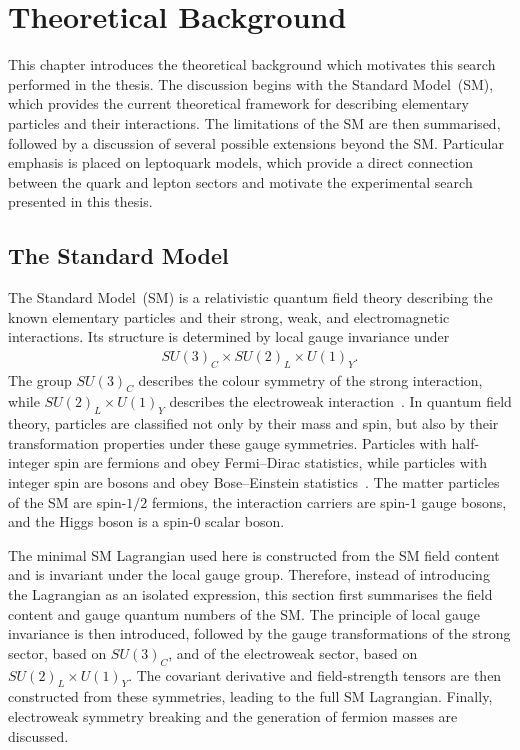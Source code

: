 \chapter{Theoretical Background}
\label{chapter:theoretical_background}

This chapter introduces the theoretical background which motivates this search performed in the thesis. 
The discussion begins with the Standard Model~(SM), which provides the current theoretical framework for describing elementary particles and their interactions. 
The limitations of the SM are then summarised, followed by a discussion of several possible extensions beyond the SM. 
Particular emphasis is placed on leptoquark models, which provide a direct connection between the quark and lepton sectors and motivate the experimental search presented in this thesis.

\section{The Standard Model}
\label{sec:sm}

The Standard Model~(SM) is a relativistic quantum field theory describing the known elementary particles and their strong, weak, and electromagnetic interactions. 
Its structure is determined by local gauge invariance under
\begin{align}
    SU(3)_{C} \times SU(2)_{L} \times U(1)_{Y}.
\end{align}
The group $SU(3)_{C}$ describes the colour symmetry of the strong interaction, while $SU(2)_{L} \times U(1)_{Y}$ describes the electroweak interaction~\cite{Glashow1961,Weinberg1967,Salam1968}. 
In quantum field theory, particles are classified not only by their mass and spin, but also by their transformation properties under these gauge symmetries. 
Particles with half-integer spin are fermions and obey Fermi--Dirac statistics, while particles with integer spin are bosons and obey Bose--Einstein statistics~\cite{Pauli1940}. 
The matter particles of the SM are spin-$1/2$ fermions, the interaction carriers are spin-$1$ gauge bosons, and the Higgs boson is a spin-$0$ scalar boson.

The minimal SM Lagrangian used here is constructed from the SM field content and is invariant under the local gauge group. Therefore, instead of introducing the Lagrangian as an isolated expression, this section first summarises the field content and gauge quantum numbers of the SM. The principle of local gauge invariance is then introduced, followed by the gauge transformations of the strong sector, based on $SU(3)_{C}$, and of the electroweak sector, based on $SU(2)_{L}\times U(1)_{Y}$. The covariant derivative and field-strength tensors are then constructed from these symmetries, leading to the full SM Lagrangian.
Finally, electroweak symmetry breaking and the generation of fermion masses are discussed.


